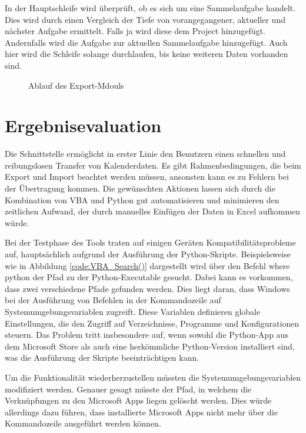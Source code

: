 \documentclass[11pt,a4paper]{report}
\begin{document}
\noindent
In der Hauptschleife wird überprüft, ob es sich um eine Sammelaufgabe handelt. Dies wird durch einen Vergleich der \glqq Tiefe \grqq{} von vorangegangener, aktueller und nächster Aufgabe ermittelt. Falls ja wird diese dem Project hinzugefügt. Andernfalls wird die Aufgabe zur aktuellen Sammelaufgabe hinzugefügt. Auch hier wird die Schleife solange durchlaufen, bis keine weiteren Daten vorhanden sind.
\begin{figure}[H]
    \centerline{}
    \caption{Ablauf des Export-Mdouls}
    \label{fig:export_module}
\end{figure}

\section{Ergebnisevaluation}

Die Schnittstelle ermöglicht in erster Linie den Benutzern einen schnellen und reibungslosen Transfer von Kalenderdaten. Es gibt Rahmenbedingungen, die beim Export und Import beachtet werden müssen, ansonsten kann es zu Fehlern bei der Übertragung kommen. Die gewünschten Aktionen lassen sich durch die Kombination von VBA und Python gut automatisieren und minimieren den zeitlichen Aufwand, der durch manuelles Einfügen der Daten in Excel aufkommen würde.

\noindent
Bei der Testphase des Tools traten auf einigen Geräten Kompatibilitätsprobleme auf, hauptsächlich aufgrund der Ausführung der Python-Skripte. Beispielsweise wie in Abbildung \ref{code:VBA_Search()} dargestellt wird über den Befehl \glqq where python \grqq{} der Pfad zu der Python-Executable gesucht. Dabei kann es vorkommen, dass zwei verschiedene Pfade gefunden werden. Dies liegt daran, dass Windows bei der Ausführung von Befehlen in der Kommandozeile auf Systemumgebungsvariablen zugreift. Diese Variablen definieren globale Einstellungen, die den Zugriff auf Verzeichnisse, Programme und Konfigurationen steuern. Das Problem tritt insbesondere auf, wenn sowohl die Python-App aus dem Microsoft Store als auch eine herkömmliche Python-Version installiert sind, was die Ausführung der Skripte beeinträchtigen kann.

\noindent
Um die Funktionalität wiederherzustellen müssten die Systemumgebungsvariablen modifiziert werden. Genauer gesagt müsste der Pfad, in welchem die Verknüpfungen zu den Microsoft Apps liegen gelöscht werden. Dies würde allerdings dazu führen, dass installierte Microsoft Apps nicht mehr über die Kommandozeile ausgeführt werden können.
\end{document}
